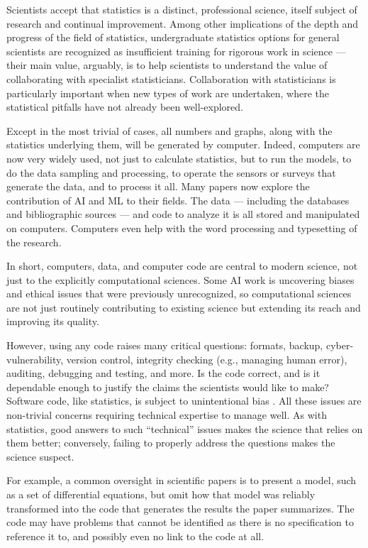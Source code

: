 \documentclass{comjnl}
\begin{document}
Scientists accept that statistics is a distinct, professional science, itself subject of research and continual improvement. Among other implications of the depth and progress of the field of statistics, undergraduate statistics options for general scientists are recognized as insufficient training for rigorous work in science --- their main value, arguably, is to help scientists to understand the value of collaborating with specialist statisticians. Collaboration with statisticians is particularly important when new types of work are undertaken, where the statistical pitfalls have not already been well-explored.

Except in the most trivial of cases, all numbers and graphs, along with the statistics underlying them, will be generated by computer. Indeed, computers are now very widely used, not just to calculate statistics, but to run the models, to do the data sampling and processing, to operate the sensors or surveys that generate the data, and to process it all. Many papers now explore the contribution of AI and ML to their fields. The data --- including the databases and bibliographic sources --- and code to analyze it is all stored and manipulated on computers. Computers even help with the word processing and typesetting of the research.

In short, computers, data, and computer code are central to modern science, not just to the explicitly computational sciences. Some AI work is uncovering biases and ethical issues that were previously unrecognized, so computational sciences are not just routinely contributing to existing science but extending its reach and improving its quality.

However, using any code raises many critical questions: formats, backup, cyber-vulnerability, version control, integrity checking (e.g., managing human error), auditing, debugging and testing, and more. Is the code correct, and is it dependable enough to justify the claims the scientists would like to make? Software code, like statistics, is subject to unintentional bias \cite{Ben,se-bias}. All these issues are non-trivial concerns requiring technical expertise to manage well. As with statistics, good answers to such ``technical'' issues makes the science that relies on them better; conversely, failing to properly address the questions makes the science suspect.

For example, a common oversight in scientific papers is to present a model, such as a set of differential equations, but omit how that model was reliably transformed into the code that generates the results the paper summarizes. The code may have problems that cannot be identified as there is no specification to reference it to, and possibly even no link to the code at all. 
\end{document}
